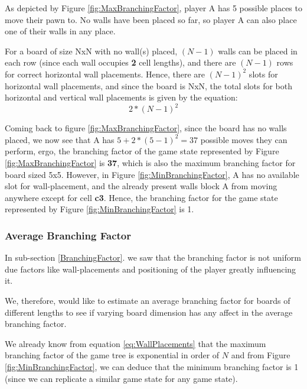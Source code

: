 As depicted by Figure \ref{fig:MaxBranchingFactor}, player A has 5 possible places to move their pawn to. No walls have been placed so far, so player A can also place one of their walls in any place.
\par
For a board of size NxN with no wall(s) placed, $(N-1)$ walls can be placed in each row (since each wall occupies \textbf{2} cell lengths), and there are $(N-1)$ rows for correct horizontal wall placements. Hence, there are $(N-1)^2$ slots for horizontal wall placements, and since the board is NxN, the total  slots for both horizontal and vertical wall placements is given by the equation:
\begin{equation}
\label{eq:WallPlacements}
    2*(N-1)^2
\end{equation}

\par
Coming back to figure \ref{fig:MaxBranchingFactor}, since the board has no walls placed, we now see that A has $5 + 2*(5-1)^2 = 37$ possible moves they can perform, ergo, the branching factor of the game state represented by Figure \ref{fig:MaxBranchingFactor} is \textbf{37}, which is also the maximum branching factor for board sized 5x5.
\newline
\newline
However, in Figure \ref{fig:MinBranchingFactor}, A has no available slot for wall-placement, and the already present walls block A from moving anywhere except for cell \textbf{c3}. Hence, the branching factor for the game state represented by Figure \ref{fig:MinBranchingFactor} is 1.

\subsubsection{Average Branching Factor}

In sub-section \ref{BranchingFactor}. we saw that the branching factor is not uniform due factors like wall-placements and positioning of the player greatly influencing it.
\par
We, therefore, would like to estimate an average branching factor for boards of different lengths to see if varying board dimension has any affect in the average branching factor.
\par
We already know from equation \ref{eq:WallPlacements} that the maximum branching factor of the game tree is exponential in order of $N$ and from Figure \ref{fig:MinBranchingFactor}, we can deduce that the minimum branching factor is 1 (since we can replicate a similar game state for any game state).

